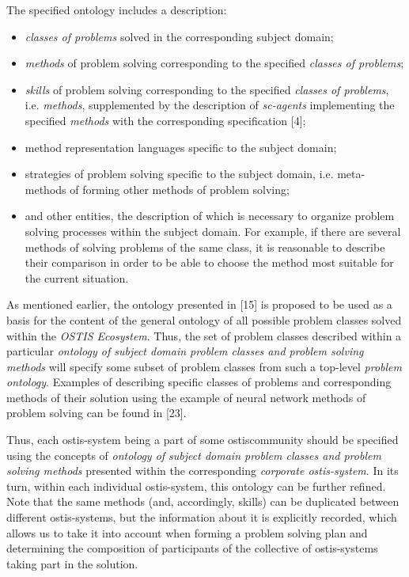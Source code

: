\documentclass[9pt, letterpaper]{article}
\begin{document}
\begin{spacing}{0.97}
\begin{multicols}
The specified ontology includes a description:
\begin{itemize}
        \item \textit{classes of problems} solved in the corresponding
subject domain;
    \item \textit{methods} of problem solving corresponding to the
specified \textit{classes of problems};
    \item \textit{skills} of problem solving corresponding to the specified \textit{classes of problems}, i.e. \textit{methods}, supplemented by the description of \textit{sc-agents} implementing the
specified \textit{methods} with the corresponding specification [4];
    \item method representation languages specific to the subject domain;
    \item strategies of problem solving specific to the subject domain, i.e. meta-methods of forming other methods
of problem solving;
    \item and other entities, the description of which is necessary to organize problem solving processes within
the subject domain. For example, if there are several
methods of solving problems of the same class, it
is reasonable to describe their comparison in order
to be able to choose the method most suitable for
the current situation.
\end{itemize}

As mentioned earlier, the ontology presented in [15]
is proposed to be used as a basis for the content of the
general ontology of all possible problem classes solved
within the \textit{OSTIS Ecosystem}. Thus, the set of problem
classes described within a particular \textit{ontology of subject
domain problem classes and problem solving methods}
will specify some subset of problem classes from such
a top-level \textit{problem ontology}. Examples of describing
specific classes of problems and corresponding methods
of their solution using the example of neural network
methods of problem solving can be found in [23].

Thus, each ostis-system being a part of some ostiscommunity should be specified using the concepts of
\textit{ontology of subject domain problem classes and problem solving methods} presented within the corresponding
\textit{corporate ostis-system}. In its turn, within each individual
ostis-system, this ontology can be further refined. Note
that the same methods (and, accordingly, skills) can
be duplicated between different ostis-systems, but the
information about it is explicitly recorded, which allows
us to take it into account when forming a problem solving
plan and determining the composition of participants of
the collective of ostis-systems taking part in the solution.


\end{multicols}
\end{spacing}
\end{document}
